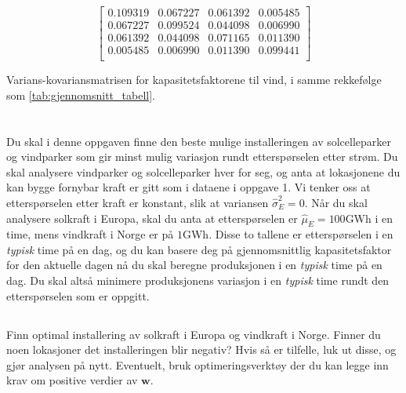 \documentclass{article}
\begin{document}
\begin{table}[h]
\centering
$$
\begin{bmatrix}
0.109319 & 0.067227 & 0.061392 & 0.005485 \\
0.067227 & 0.099524 & 0.044098 & 0.006990 \\
0.061392 & 0.044098 & 0.071165 & 0.011390 \\
0.005485 & 0.006990 & 0.011390 & 0.099441 \\
\end{bmatrix}
$$
\caption{Varians-kovariansmatrisen for kapasitetsfaktorene til vind, i samme rekkefølge som \autoref{tab:gjennomsnitt_tabell}.}
\label{tab:var_cov_vind}
\end{table}

\newpage
\section{}
Du skal i denne oppgaven finne den beste mulige installeringen av solcelleparker og vindparker som gir minst mulig variasjon rundt etterspørselen etter strøm.
Du skal analysere vindparker og solcelleparker hver for seg, og anta at lokasjonene du kan bygge fornybar kraft er gitt som i dataene i oppgave 1.
Vi tenker oss at etterspørselen etter kraft er konstant, slik at variansen $\hat{\sigma}_E^2 = 0$.
Når du skal analysere solkraft i Europa, skal du anta at etterspørselen er $\hat{\mu}_E = 100$GWh i en time, mens vindkraft i Norge er på $1$GWh.
Disse to tallene er etterspørselen i en \textit{typisk} time på en dag, og du kan basere deg på gjennomsnittlig kapasitetsfaktor for den aktuelle dagen nå du skal beregne produksjonen i en \textit{typisk} time på en dag.
Du skal altså minimere produksjonens variasjon i en \textit{typisk} time rundt den etterspørselen som er oppgitt.

\subsection{}
Finn optimal installering av solkraft i Europa og vindkraft i Norge.
Finner du noen lokasjoner det installeringen blir negativ?
Hvis så er tilfelle, luk ut disse, og gjør analysen på nytt.
Eventuelt, bruk optimeringsverktøy der du kan legge inn krav om positive verdier av $\mathbf{w}$.
\end{document}
